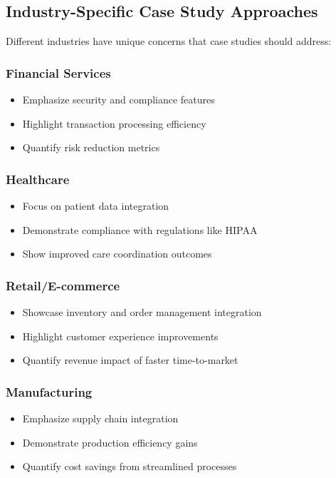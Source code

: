 \documentclass[11pt,a4paper]{article}
\begin{document}
\subsection{Industry-Specific Case Study Approaches}

Different industries have unique concerns that case studies should address:

\subsubsection{Financial Services}
\begin{itemize}
    \item Emphasize security and compliance features
    \item Highlight transaction processing efficiency
    \item Quantify risk reduction metrics
\end{itemize}

\subsubsection{Healthcare}
\begin{itemize}
    \item Focus on patient data integration
    \item Demonstrate compliance with regulations like HIPAA
    \item Show improved care coordination outcomes
\end{itemize}

\subsubsection{Retail/E-commerce}
\begin{itemize}
    \item Showcase inventory and order management integration
    \item Highlight customer experience improvements
    \item Quantify revenue impact of faster time-to-market
\end{itemize}

\subsubsection{Manufacturing}
\begin{itemize}
    \item Emphasize supply chain integration
    \item Demonstrate production efficiency gains
    \item Quantify cost savings from streamlined processes
\end{itemize}
\end{document}
